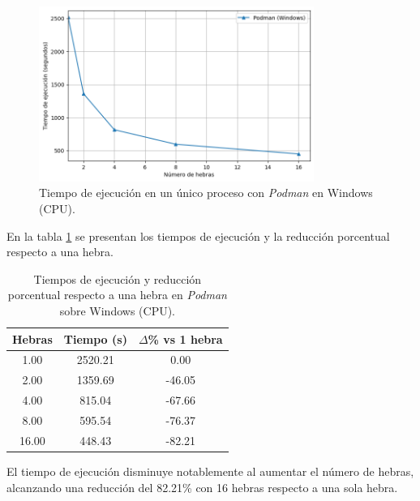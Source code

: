 \begin{figure}[H]
    \centering
    \includegraphics[width=0.8\textwidth]{imagenes/cap5/single-node_windows_podman_time.png}
    \caption{Tiempo de ejecución en un único proceso con \textit{Podman} en Windows (CPU).}
    \label{fig:single-node_windows_podman_time}
\end{figure}

En la tabla \ref{tab:single-node_windows_podman_time} se presentan los tiempos de ejecución y la reducción porcentual respecto a una hebra.

\begin{table}[ht]
    \centering
    \begin{tabular}{|c|c|c|}
        \hline
        \textbf{Hebras} & \textbf{Tiempo (s)} & \textbf{$\Delta$\% vs 1 hebra} \\
        \hline
        1.00            & 2520.21             & 0.00                           \\
        2.00            & 1359.69             & -46.05                         \\
        4.00            & 815.04              & -67.66                         \\
        8.00            & 595.54              & -76.37                         \\
        16.00           & 448.43              & -82.21                         \\
        \hline
    \end{tabular}
    \caption{Tiempos de ejecución y reducción porcentual respecto a una hebra en \textit{Podman} sobre Windows (CPU).}
    \label{tab:single-node_windows_podman_time}
\end{table}

El tiempo de ejecución disminuye notablemente al aumentar el número de hebras, alcanzando una reducción del 82.21\% con 16 hebras respecto a una sola hebra.

